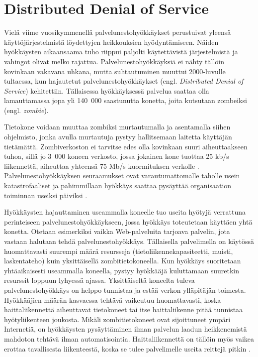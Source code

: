 \section{Distributed Denial of Service}

Vielä viime vuosikymmenellä palvelunestohyökkäykset perustuivat
yleensä käyttöjärjestelmistä löydettyjen heikkouksien
hyödyntämiseen. Näiden hyökkäysten aikaansaama tuho riippui paljolti
käytettävistä järjestelmistä ja vahingot olivat melko
rajattua. Palvelunestohyökkäyksiä ei nähty tällöin kovinkaan vakavana
uhkana, mutta suhtautuminen muuttui 2000-luvulle tultaessa, kun
hajautetut palvelunestohyökkäykset (engl. \textit{Distributed Denial
of Service}) kehitettiin. Tällaisessa hyökkäyksessä palvelua saattaa
olla lamauttamassa jopa yli 140~000 saastunutta konetta, joita
kutsutaan zombeiksi (engl. \textit{zombie}).

Tietokone voidaan muuttaa zombiksi murtautumalla ja asentamalla siihen
ohjelmisto, jonka avulla murtautuja pystyy hallitsemaan laitetta
käyttäjän tietämättä. Zombiverkoston ei tarvitse edes olla kovinkaan
suuri aiheuttaakseen tuhoa, sillä jo 3~000 koneen verkosto, jossa
jokainen kone tuottaa 25 kb/s liikennettä, aiheuttaa yhteensä 75 Mb/s
kuormituksen verkolle \cite{Hacking}.  Palvelunestohyökkäyksen
seuraamukset ovat varautumattomalle taholle usein katastrofaaliset ja
pahimmillaan hyökkäys saattaa pysäyttää organisaation toiminnan
useiksi päiviksi \cite{CERT}.

Hyökkäysten hajauttaminen useammalla koneelle tuo useita hyötyjä
verrattuna perinteiseen palvelunestohyökkäykseen, jossa hyökkäys
toteutetaan käyttäen yhtä konetta. Otetaan esimerkiksi vaikka
Web-palveluita tarjoava palvelin, jota vastaan halutaan tehdä
palvelunestohyökkäys. Tällaisella palvelimella on käytössä
huomattavasti suurempi määrä resursseja (tietoliikennekapasiteetti,
muisti, laskentateho) kuin yksittäisellä zombitietokoneella. Kun
hyökkäys suoritetaan yhtäaikaisesti u\-se\-am\-mal\-la koneella, pystyy
hyökkääjä kuluttamaan suuretkin resurssit loppuun lyhyessä
ajassa. Yksittäiseltä koneelta tuleva palvelunestohyökkäys on helppo
tunnistaa ja estää verkon ylläpitäjän toimesta. Hyökkääjien määrän
kasvaessa tehtävä vaikeutuu huomattavasti, koska haittaliikennettä
aiheuttavat tietokoneet tai itse haittaliikenne pitää tunnistaa
hyötyliikenteen joukosta. Mikäli zombitietokoneet ovat sijoittuneet ympäri
Internetiä, on hyökkäysten pysäyttäminen ilman palvelun laadun heikkenemistä
mahdoton tehtävä ilman automatisointia. Haittaliikennettä on tällöin myös
vaikea erottaa tavallisesta liikenteestä, koska se tulee palvelimelle
useita reittejä pitkin \cite{DDOS}.

